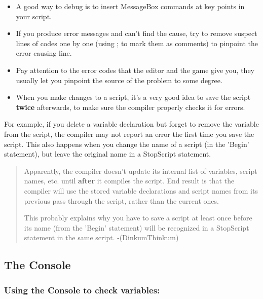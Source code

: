 \documentclass[
]{article}
\begin{document}
\begin{itemize}
\item
  A good way to debug is to insert MessageBox commands at key points in
  your script.
\item
  If you produce error messages and can't find the cause, try to remove
  suspect lines of codes one by one (using ; to mark them as comments)
  to pinpoint the error causing line.
\item
  Pay attention to the error codes that the editor and the game give
  you, they usually let you pinpoint the source of the problem to some
  degree.
\item
  When you make changes to a script, it's a very good idea to save the
  script \textbf{twice} afterwards, to make sure the compiler properly
  checks it for errors.
\end{itemize}

For example, if you delete a variable declaration but forget to remove
the variable from the script, the compiler may not report an error the
first time you save the script. This also happens when you change the
name of a script (in the 'Begin' statement), but leave the original name
in a StopScript statement.

\begin{quote}
Apparently, the compiler doesn't update its internal list of variables,
script names, etc. until \textbf{after} it compiles the script. End
result is that the compiler will use the stored variable declarations
and script names from its previous pass through the script, rather than
the current ones.

This probably explains why you have to save a script at least once
before its name (from the 'Begin' statement) will be recognized in a
StopScript statement in the same script. -(DinkumThinkum)
\end{quote}

\hypertarget{the-console}{%
\subsection{The Console}\label{the-console}}

\hypertarget{using-the-console-to-check-variables}{%
\subsubsection{Using the Console to check
variables:}\label{using-the-console-to-check-variables}}
\end{document}
